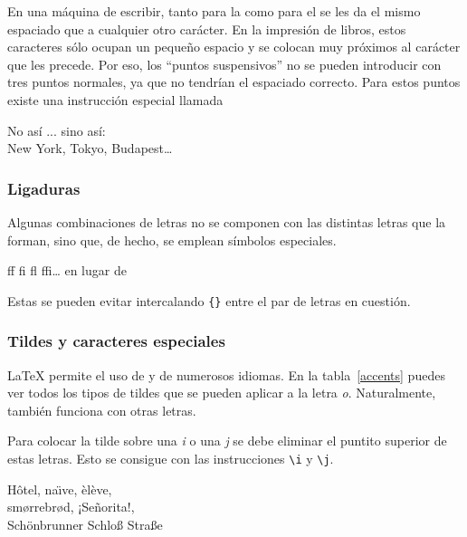 En  una máquina  de escribir,  tanto para  la   como para  el
 se les da el mismo espaciado que a cualquier otro carácter.
En la  impresión de  libros, estos caracteres  sólo ocupan  un pequeño
espacio y  se colocan muy  próximos al  carácter que les  precede. Por
eso,  los ``puntos  suspensivos''  no se  pueden  introducir con  tres
puntos normales, ya que no  tendrían el espaciado correcto. Para estos
puntos existe una instrucción especial llamada

\begin{command}
\end{command}
\begin{example}
No así ... sino así:\\
New York, Tokyo, Budapest\ldots
\end{example}
 
\subsubsection{Ligaduras}

Algunas  combinaciones de  letras  no se  componen  con las  distintas
letras  que  la  forman,  sino  que, de  hecho,  se  emplean  símbolos
especiales.

\begin{code}
{\large ff fi fl ffi\ldots}\quad
en lugar de
\end{code}
Estas  se pueden evitar intercalando \verb|{}|
entre el par de letras en cuestión.

\subsubsection{Tildes y caracteres especiales}

\LaTeX{} permite  el uso  de  y  
de  numerosos  idiomas. En  la  tabla~\ref{accents}  puedes ver  todos
los  tipos de  tildes  que  se pueden  aplicar  a  la letra  \emph{o}.
Naturalmente, también funciona con otras letras.

Para  colocar la  tilde  sobre una  \emph{i} o  una  \emph{j} se  debe
eliminar el puntito superior de estas letras. Esto se consigue con las
instrucciones \verb|\i| y \verb|\j|.

\begin{example}
H\^otel, na\"\i ve, \`el\`eve,\\ 
sm\o rrebr\o d, ¡Se\~norita!,\\
Sch\"onbrunner Schlo\ss{} 
Stra\ss e
\end{example}

